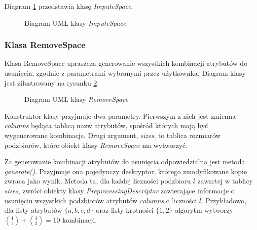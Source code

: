 \documentclass[../thesis.tex]{subfiles}
\begin{document}
Diagram \ref{proj:diagram_impute_space} przedstawia klasę \emph{ImputeSpace}.

\begin{figure}[h]
\centering
{}
\caption{Diagram UML klasy \emph{ImputeSpace}}
\label{proj:diagram_impute_space}
\end{figure}

\subsubsection{Klasa RemoveSpace}

Klasa RemoveSpace upraszcza generowanie wszystkich kombinacji atrybutów do usunięcia, zgodnie z parametrami wybranymi przez użytkownka. Diagram klasy jest zilustrowany na rysunku \ref{proj:diagram_remove_space}.

\begin{figure}[h]
\centering
{}
\caption{Diagram UML klasy \emph{RemoveSpace}}
\label{proj:diagram_remove_space}
\end{figure}

Konstruktor klasy przyjmuje dwa parametry. Pierwszym z nich jest zmienna \emph{columns} będąca tablicą nazw atrybutów, spośród których mają być wygenerowane kombinacje. Drugi argument, \emph{sizes}, to tablica rozmiarów podzbiorów, które obiekt klasy \emph{RemoveSpace} ma wytworzyć.

Za generowanie kombinacji atrybutów do usunięcia odpowiedzialna jest metoda \emph{generate()}. Przyjmuje ona pojedynczy deskryptor, którego zmodyfikowane kopie zwraca jako wynik. Metoda ta, dla każdej liczności podzbioru $l$ zawartej w tablicy \emph{sizes}, zwróci obiekty klasy \emph{PreprocessingDescriptor} zawierające informacje o usunięciu wszystkich podzbiorów atrybutów \emph{columns} o liczności $l$. Przykładowo, dla listy atrybutów $\{a, b, c, d\}$ oraz listy krotności $\{1, 2\}$ algorytm wytworzy ${4 \choose 1} + {4 \choose 2} = 10$ kombinacji. 
\end{document}
